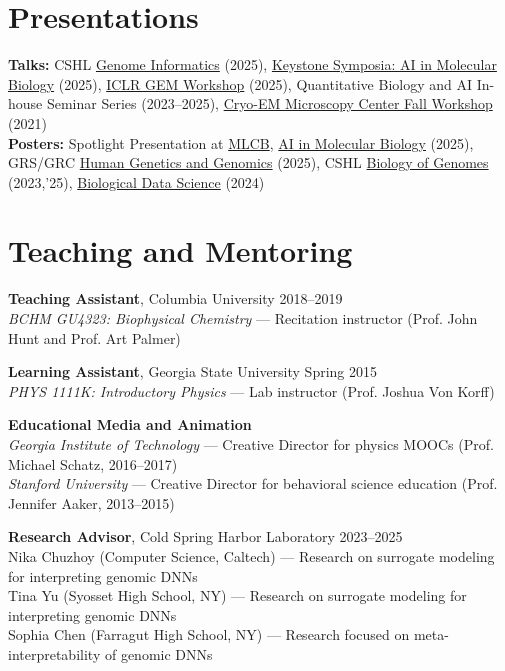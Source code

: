 \documentclass[11pt]{article}
\begin{document}
\section*{\textcolor{Mahogany}{Presentations}}
{\small
\textbf{Talks:} CSHL \href{https://meetings.cshl.edu/meetings.aspx?meet=INFO&year=25}{Genome Informatics} (2025), \href{https://www.keystonesymposia.org/conferences/conference-listing/meeting/g22026}{Keystone Symposia: AI in Molecular Biology} (2025), \href{https://www.gembio.ai/}{ICLR GEM Workshop} (2025), Quantitative Biology and AI In-house Seminar Series (2023–2025), \href{https://www.vagelos.columbia.edu/research/researchers/core-and-shared-facilities/new-instruments-and-facilities/cryo-electron-microscopy-center}{Cryo-EM Microscopy Center Fall Workshop} (2021) \\
\textbf{Posters:} Spotlight Presentation at \href{https://www.mlcb.org/}{MLCB},  \href{https://www.keystonesymposia.org/conferences/conference-listing/meeting/g22026}{AI in Molecular Biology} (2025), GRS/GRC \href{https://www.grc.org/human-genetics-and-genomics-conference/2025/}{Human Genetics and Genomics} (2025), CSHL \href{https://meetings.cshl.edu/meetings.aspx?meet=GENOME}{Biology of Genomes} (2023,'25), \href{https://meetings.cshl.edu/meetings.aspx?meet=DATA}{Biological Data Science} (2024)
}

\section*{\textcolor{Mahogany}{Teaching and Mentoring}}
{\small
\textbf{Teaching Assistant}, Columbia University \hfill 2018–2019\\
\textit{BCHM GU4323: Biophysical Chemistry} — Recitation instructor (Prof. John Hunt and Prof. Art Palmer)

\textbf{Learning Assistant}, Georgia State University \hfill Spring 2015\\
\textit{PHYS 1111K: Introductory Physics} — Lab instructor (Prof. Joshua Von Korff)

\textbf{Educational Media and Animation}\\
\textit{Georgia Institute of Technology} — Creative Director for physics MOOCs (Prof. Michael Schatz, 2016–2017)\\
\textit{Stanford University} — Creative Director for behavioral science education (Prof. Jennifer Aaker, 2013–2015)

\textbf{Research Advisor}, Cold Spring Harbor Laboratory \hfill 2023–2025\\
Nika Chuzhoy (Computer Science, Caltech) — Research on surrogate modeling for interpreting genomic DNNs\\
Tina Yu (Syosset High School, NY) — Research on surrogate modeling for interpreting genomic DNNs\\
Sophia Chen (Farragut High School, NY) — Research focused on meta-interpretability of genomic DNNs
}
\end{document}
